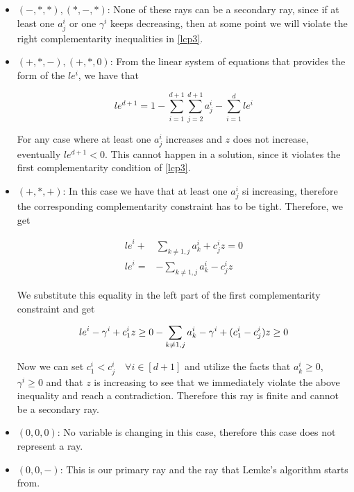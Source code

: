 \documentclass[a4paper,11pt]{article}
\begin{document}
\begin{itemize}
\item $(-, *, *), (*, -, *)$: None of these rays can be a secondary ray, since if at least one $a^i_j$ or one
$\gamma^i$ keeps decreasing, then at some point we will violate the right complementarity inequalities in
\eqref{lcp3}.

\item $(+, *, -), (+, *, 0)$: From the linear system of equations that provides the form of the $le^i$, we have that

\[
le^{d+1} = 1 - \sum_{i=1}^{d+1} {\sum_{j = 2}^{d+1} {a^i_j}} - \sum_{i = 1}^d {le^i}
\]

\par For any case where at least one $a^i_j$ increases and $z$ does not increase, eventually $le^{d+1} < 0$. This cannot
happen in a solution, since it violates the first complementarity condition of \eqref{lcp3}.

\item $(+, *, +)$: In this case we have that at least one $a^i_j$ si increasing, therefore the corresponding
complementarity constraint has to be tight. Therefore, we get

\begin{align*}
{le}^i + & \sum_{k \neq 1, j} {a^i_k} + c^i_j z = 0 \\
{le}^i = & - \sum_{k \neq 1, j} {a^i_k} - c^i_j z
\end{align*}

\par We substitute this equality in the left part of the first complementarity constraint and get

\[
{le}^i - \gamma^i + c^i_1 z \geq 0 \\
- \sum_{k \neq 1, j} {a^i_k} - \gamma^i + (c^i_1 - c^i_j) z \geq 0
\]

\par Now we can set $c^i_1 < c^i_j \quad \forall i \in [d+1]$ and utilize the facts that $a^i_k \geq 0$,
$\gamma^i \geq 0$ and that $z$ is increasing to see that we immediately violate the above inequality and
reach a contradiction. Therefore this ray is finite and cannot be a secondary ray.

\item $(0, 0, 0)$: No variable is changing in this case, therefore this case does not represent a ray.

\item $(0, 0, -)$: This is our primary ray and the ray that Lemke's algorithm starts from.


\end{itemize}
\end{document}
